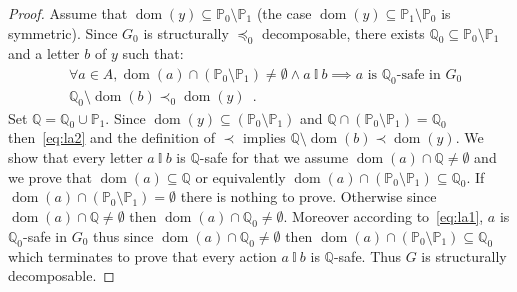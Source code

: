 \documentclass[a4paper,UKenglish]{lipics-v2016}
\newcommand{\PP}{\mathbb{P}}
\newcommand{\QQ}{\mathbb{Q}}
\newcommand{\ind}{~\mathbb{I}~}
\DeclareMathOperator{\dom}{dom}
\begin{document}
\begin{proof}
Assume that $\dom(y)\subseteq \PP_0\setminus \PP_1$
(the case $\dom(y)\subseteq \PP_1\setminus \PP_0$ is symmetric).
Since $G_0$ is structurally $\preceq_0$ decomposable,
there exists $\QQ_0\subseteq \PP_0\setminus \PP_1$ and a letter $b$ of $y$ such that:
\begin{align}
\label{eq:la1}
&\forall a \in A, \dom(a) \cap (\PP_0\setminus \PP_1)\neq \emptyset \land a\ind b \implies \text{$a$  is $\QQ_0$-safe in $G_0$}\\
\label{eq:la2}
&\QQ_0\setminus \dom(b) \prec_0 \dom(y)\enspace.
\end{align}
Set $\QQ=\QQ_0 \cup \PP_1$.
 Since $\dom(y)\subseteq (\PP_0\setminus \PP_1)$  
 and $\QQ\cap (\PP_0\setminus \PP_1)=\QQ_0$
 then~\eqref{eq:la2} and the definition of $\prec$
 implies
  $\QQ\setminus \dom(b) \prec \dom(y)$. 
  We show that every letter $a \ind b$  is $\QQ$-safe for that we assume $\dom(a) \cap \QQ \neq\emptyset$ and
  we prove that $\dom(a) \subseteq \QQ$
  or equivalently $\dom(a) \cap (\PP_0\setminus\PP_1) \subseteq \QQ_0$.
  If $\dom(a) \cap (\PP_0\setminus\PP_1)=\emptyset$ there is nothing to prove.
Otherwise since $\dom(a) \cap \QQ \neq\emptyset$
  then $\dom(a) \cap \QQ_0 \neq \emptyset$.
  Moreover
 according to~\eqref{eq:la1}, $a$ is $\QQ_0$-safe in $G_0$ thus since $\dom(a) \cap \QQ_0 \neq \emptyset$
 then 
  $\dom(a) \cap (\PP_0 \setminus \PP_1)\subseteq \QQ_0$ which terminates to prove that every action $a\ind b$ is $\QQ$-safe. Thus $G$ is structurally decomposable.
\end{proof}
\end{document}
